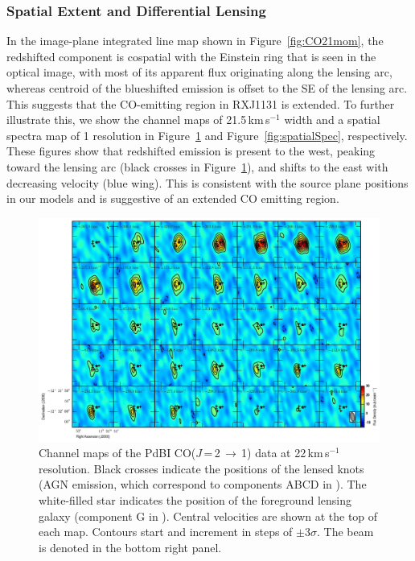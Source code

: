 \documentclass[]{emulateapj}
\newcommand{\rarr}{$\rightarrow$}
\newcommand{\bco}{\mbox{CO($J$\,=\,2\,\rarr\,1)}\xspace}
\newcommand{\kms}{\mbox{km\,s$^{-1}$}\xspace}
\newcommand{\Fig}[1]{Figure~\ref{fig:#1}}
\begin{document}
\subsubsection{Spatial Extent and Differential Lensing} \label{sec:differential}
In the image-plane integrated line map shown in \Fig{CO21mom}, the redshifted component is
cospatial with the Einstein ring that is seen in the
optical image, with most of its apparent flux originating along the lensing arc,
whereas centroid of the blueshifted emission is offset to the SE of
the lensing arc. This suggests that the CO-emitting region in RXJ1131 is extended.
To further illustrate this, we show the
channel maps of 21.5\,\kms width and a spatial spectra map of 1 resolution in
\Fig{chanmap} and \Fig{spatialSpec}, respectively. These figures
show that redshifted emission
is present to the west, peaking toward the lensing arc (black crosses in
\Fig{chanmap}), and shifts to the east with decreasing velocity
(blue wing).
This is consistent with the source plane positions in our models and
is suggestive of an extended CO emitting region.

\begin{figure}[!htbp]
\centering
\includegraphics[width=1.0\textwidth]{f7.pdf}
\caption{
Channel maps of the PdBI \bco data at 22\,\kms resolution.
Black crosses indicate the positions of the lensed knots (AGN emission,
which correspond to components ABCD in ). The white-filled
star indicates the position of the foreground lensing galaxy (component G
in ).
Central velocities are shown at the top of each map.
Contours start and increment in steps of
$\pm$3$\sigma$. The beam is denoted in the bottom right panel. \label{fig:chanmap}}
\end{figure}
\end{document}
